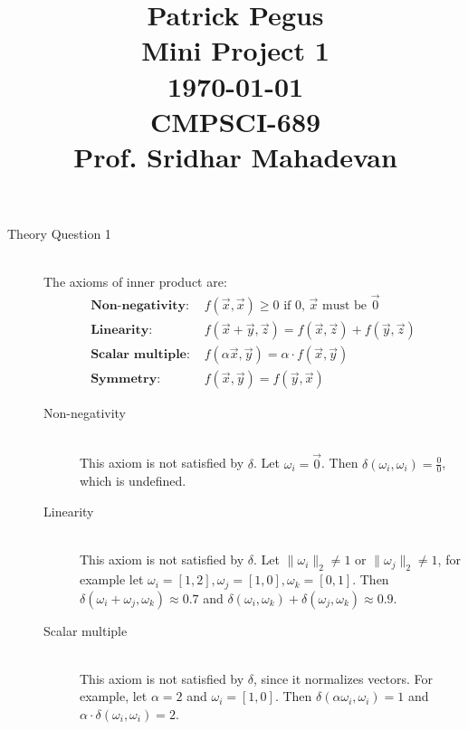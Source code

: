 \documentclass{article}
\newcommand*{\X}{\Vec{x}}
\newcommand*{\Y}{\Vec{y}}
\newcommand*{\Z}{\Vec{z}}
\newcommand*{\0}{\Vec{0}}
\newcommand*{\norm}[1]{\lVert#1\rVert_2}
\newcommand*{\al}{\alpha}
\newcommand*{\be}{\beta}
\newcommand*{\de}{\delta}
\newcommand*{\om}{\omega}
\begin{document}
\title
{\begin{flushleft}
\large
Patrick Pegus\\
Mini Project 1\\
\today\\
CMPSCI-689\\
Prof. Sridhar Mahadevan
\end{flushleft}}
\author{}
\date{}
\maketitle
\normalsize
\begin{description}
	\item[Theory Question 1] \hfill \\
		The axioms of inner product are:
		\begin{align*}
			\textbf{Non-negativity: }&f(\X,\X) \ge 0 \text{ if $0$, $\X$ must be } \0 \\
			\textbf{Linearity: }&f(\X+\Y,\Z)=f(\X,\Z)+f(\Y,\Z) \\
			\textbf{Scalar multiple: }&f(\al\X,\Y)=\al \cdot f(\X,\Y) \\
			\textbf{Symmetry: }&f(\X,\Y)=f(\Y,\X)
		\end{align*}
		\begin{description}
			\item[Non-negativity] \hfill \\
				This axiom is not satisfied by $\de$. Let $\om_i = \0$. Then $\de(\om_i,\om_i)=\frac{0}{0}$, which is undefined.
			\item[Linearity] \hfill \\
				This axiom is not satisfied by $\de$. Let $\norm{\om_i} \ne 1$ or $\norm{\om_j} \ne 1$, for example let $\om_i=[1,2],\om_j=[1,0],\om_k=[0,1]$.
				Then $\de(\om_i+\om_j,\om_k)\approx 0.7$ and $\de(\om_i,\om_k)+\de(\om_j,\om_k)\approx 0.9$.
			\item[Scalar multiple] \hfill \\
				This axiom is not satisfied by $\de$, since it normalizes vectors. For example, let $\al=2$ and $\om_i=[1,0]$.
				Then $\de(\al\om_i,\om_i)=1$ and $\al\cdot\de(\om_i,\om_i)=2$.
		\end{description}
\end{description}
\end{document}
